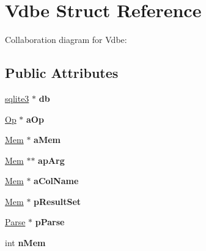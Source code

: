 \hypertarget{struct_vdbe}{\section{Vdbe Struct Reference}
\label{struct_vdbe}
}


Collaboration diagram for Vdbe\+:
\subsection*{Public Attributes}
\begin{DoxyCompactItemize}
\item 
\hypertarget{struct_vdbe_a495366101a593999f4d2ed905e839029}{\hyperlink{structsqlite3}{sqlite3} $\ast$ {\bfseries db}}\label{struct_vdbe_a495366101a593999f4d2ed905e839029}

\item 
\hypertarget{struct_vdbe_a1ba82f08947b275dd72a3e3095ad02d5}{\hyperlink{struct_vdbe_op}{Op} $\ast$ {\bfseries a\+Op}}\label{struct_vdbe_a1ba82f08947b275dd72a3e3095ad02d5}

\item 
\hypertarget{struct_vdbe_ac36776c53b6ec9054a2826ec83f29953}{\hyperlink{struct_mem}{Mem} $\ast$ {\bfseries a\+Mem}}\label{struct_vdbe_ac36776c53b6ec9054a2826ec83f29953}

\item 
\hypertarget{struct_vdbe_a74fd4612c55ac2fde475096a4d2605b5}{\hyperlink{struct_mem}{Mem} $\ast$$\ast$ {\bfseries ap\+Arg}}\label{struct_vdbe_a74fd4612c55ac2fde475096a4d2605b5}

\item 
\hypertarget{struct_vdbe_a900f557143e7d2ab8c560f7ada66d0f7}{\hyperlink{struct_mem}{Mem} $\ast$ {\bfseries a\+Col\+Name}}\label{struct_vdbe_a900f557143e7d2ab8c560f7ada66d0f7}

\item 
\hypertarget{struct_vdbe_a0dec47b8d8c481df2b73d5bbf9cdde11}{\hyperlink{struct_mem}{Mem} $\ast$ {\bfseries p\+Result\+Set}}\label{struct_vdbe_a0dec47b8d8c481df2b73d5bbf9cdde11}

\item 
\hypertarget{struct_vdbe_a90fc4cdcc206a8f62c18e860b78f5cda}{\hyperlink{struct_parse}{Parse} $\ast$ {\bfseries p\+Parse}}\label{struct_vdbe_a90fc4cdcc206a8f62c18e860b78f5cda}

\item 
\hypertarget{struct_vdbe_a10a19309607617a75d3722219d3c7615}{int {\bfseries n\+Mem}}\label{struct_vdbe_a10a19309607617a75d3722219d3c7615}


\end{DoxyCompactItemize}

